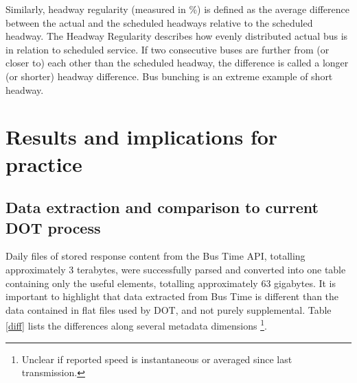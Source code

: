 \documentclass[12pt]{report}
\begin{document}
Similarly, headway regularity (measured in \%) is defined as the average difference between the actual and the scheduled headways relative to the scheduled headway. The Headway Regularity describes how evenly distributed actual bus is in relation to scheduled service. If two consecutive buses are further from (or closer to) each other than the scheduled headway, the difference is called a longer (or shorter) headway difference. Bus bunching is an extreme example of short headway.

\newpage

\section{Results and implications for practice}


\subsection{Data extraction and comparison to current DOT process} 

Daily files of stored response content from the Bus Time API, totalling approximately 3 terabytes, were successfully parsed and converted into one table containing only the useful elements, totalling approximately 63 gigabytes.  It is important to highlight that data extracted from Bus Time is different than the data contained in flat files used by DOT, and not purely supplemental. Table \ref{diff} lists the differences along several metadata dimensions \footnote{Unclear if reported speed is instantaneous or averaged since last transmission.}.

\vspace{0.5cm}

\end{document}
